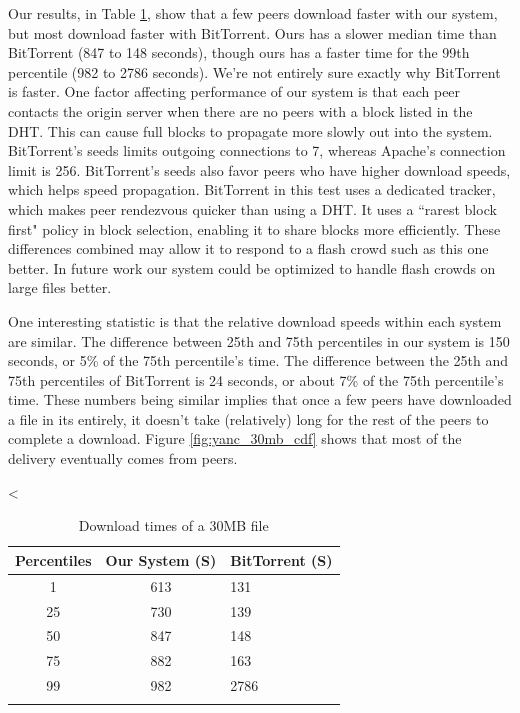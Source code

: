 Our results, in Table \ref{fig:yanc_vs_bt}, show that a few peers download 
faster with our system, but most download faster with BitTorrent. 
Ours has a slower median time than BitTorrent (847 to 148 seconds), though ours has a faster time for the 99th
percentile (982 to 2786 seconds). We're not entirely sure exactly why BitTorrent is faster.  One factor affecting performance of our system is that 
each peer contacts the origin server when there are no peers with a block listed in the DHT.  This can cause full blocks to propagate more slowly out
into the system.  BitTorrent's seeds limits outgoing connections to 7, whereas Apache's connection limit is 256.  BitTorrent's seeds also favor peers who have higher download 
speeds, which helps speed propagation.  BitTorrent in this test uses a dedicated tracker, 
which makes peer rendezvous quicker than using a DHT.  It uses a ``rarest block first" policy in block 
selection, enabling it to share blocks more efficiently.  These differences combined may allow it 
to respond to a flash crowd such as this one better.  In future work our system could be optimized to handle flash crowds on large files better.  

One interesting statistic is that the relative download speeds within each system are similar.
The difference between 25th and 75th percentiles in our system is 150 seconds, 
or 5\% of the 75th percentile's time. The difference between the 25th and 75th percentiles of BitTorrent 
is 24 seconds, or about 7\% of the 75th percentile's time. These numbers being similar implies that once 
a few peers have downloaded a file in its entirely, it doesn't take (relatively) long for the rest of the peers to complete 
a download. Figure \ref{fig:yanc_30mb_cdf} shows that most of the delivery eventually comes from peers.

<%

\begin{table}
  \caption{Download times of a 30MB file}
\begin{center}
\begin{tabular}{ c c l }
  Percentiles & Our System (S) & BitTorrent (S) \\
  \hline
  1 & 613 & 131 \\
  25 & 730 & 139 \\
  50 & 847 & 148 \\
  75 & 882 & 163 \\
  99 & 982 & 2786 \\
  \label{fig:yanc_vs_bt}
\end{tabular}
\end{center}
\end{table}


